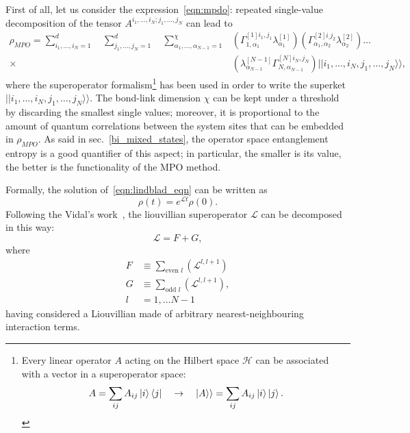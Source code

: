 First of all, let us consider the expression~\ref{eqn:mpdo}: repeated single-value decomposition of the tensor $A^{i_1,\dots, i_N; j_1,\dots, j_N}$ can lead to
\begin{equation*}
\label{mpo_ansatz}
\begin{split}
    \rho_{MPO} = \sum_{i_1, \dots ,i_N = 1}^{d}\quad \sum_{j_1, \dots ,j_N = 1}^{d}\quad \sum_{\alpha_1,\dots, \alpha_{N-1} = 1}^\chi &(\Gamma_{1, \alpha_1}^{[1]i_1, j_1}\lambda_{\alpha_1}^{[1]})(\Gamma_{\alpha_1, \alpha_2}^{[2]i_, j_2}\lambda_{\alpha_2}^{[2]}) \dots \\  \times &(\lambda_{\alpha_{N-1}}^{[N-1]}\Gamma_{N, \alpha_{N-1}}^{[N]i_N, j_N}) ||i_1, \dots ,i_N, j_1, \dots ,j_N\rangle\rangle,
    \end{split}
\end{equation*}
where the superoperator formalism\footnote{Every linear operator $A$ acting on the Hilbert space $\mathcal{H}$ can be associated with a vector in a superoperator space:
\begin{equation*}
    A = \sum_{ij} A_{ij} \ket{i}\bra{j} \quad \rightarrow \quad |A\rangle\rangle = \sum_{ij} A_{ij} \ket{i}\ket{j}.
\end{equation*}} has been used in order to write the superket \\$||i_1, \dots ,i_N, j_1, \dots ,j_N\rangle\rangle$. The bond-link dimension $\chi$ can be kept under a threshold by discarding the smallest single values; moreover, it is proportional to the amount of quantum correlations between the system sites that can be embedded in $\rho_{MPO}$. As said in sec.~\ref{bi_mixed_states}, the operator space entanglement entropy is a good quantifier of this aspect; in particular, the smaller is its value, the better is the functionality of the MPO method.

Formally, the solution of~\ref{eqn:lindblad_eqn} can be written as
\begin{equation}
\label{eqn:lindblad_dinamics}
    \rho(t) = e^{\mathcal{L}t}\rho(0).
\end{equation}
Following the Vidal's work~\cite{PhysRevLett.93.040502}, the liouvillian superoperator $\mathcal{L}$ can be decomposed in this way:
\begin{equation}
    \mathcal{L} = F + G,
\end{equation}
where
\begin{equation}
    \begin{split}
        F &\equiv \sum_{\text{even } l} (\mathcal{L}^{l, l+1}) \\
        G &\equiv \sum_{\text{odd } l} (\mathcal{L}^{l, l+1}), \\
        l  &= 1, \dots N-1
    \end{split}
\end{equation}
having considered a Liouvillian made of arbitrary nearest-neighbouring interaction terms.

